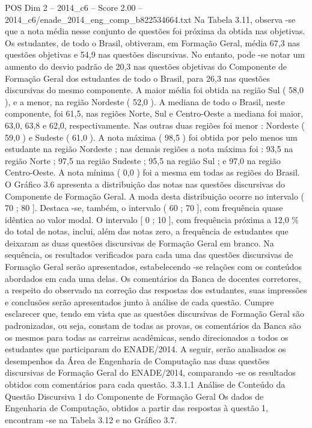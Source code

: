 \begin{textsample}{POS Dim 2 – 2014\_c6 – Score 2.00 – 2014\_c6/enade\_2014\_eng\_comp\_b822534664.txt}
Na Tabela 3.11, observa -se que a nota média nesse conjunto de questões foi próxima da obtida nas objetivas.
Os estudantes, de todo o Brasil, obtiveram, em Formação Geral, média 67,3 nas questões objetivas e 54,9 nas questões discursivas.
No entanto, pode -se notar um aumento do desvio padrão de 20,3 nas questões objetivas do Componente de Formação Geral dos estudantes de todo o Brasil, para 26,3 nas questões discursivas do mesmo componente.
A maior média foi obtida na região Sul ( 58,0 ), e a menor, na região Nordeste ( 52,0 ).
A mediana de todo o Brasil, neste componente, foi 61,5, nas regiões Norte, Sul e Centro-Oeste a mediana foi maior, 63,0, 63,8 e 62,0, respectivamente.
Nas outras duas regiões foi menor : Nordeste ( 59,0 ) e Sudeste ( 61,0 ).
A nota máxima ( 98,5 ) foi obtida por pelo menos um estudante na região Nordeste ; nas demais regiões a nota máxima foi : 93,5 na região Norte ; 97,5 na região Sudeste ; 95,5 na região Sul ; e 97,0 na região Centro-Oeste.
A nota mínima ( 0,0 ) foi a mesma em todas as regiões do Brasil.
O Gráfico 3.6 apresenta a distribuição das notas nas questões discursivas do Componente de Formação Geral.
A moda desta distribuição ocorre no intervalo ( 70 ; 80 ].
Destaca -se, também, o intervalo ( 60 ; 70 ], com frequência quase idêntica ao valor modal.
O intervalo [ 0 ; 10 ], com frequência próxima a 12,0 \% do total de notas, inclui, além das notas zero, a frequência de estudantes que deixaram as duas questões discursivas de Formação Geral em branco.
Na sequência, os resultados verificados para cada uma das questões discursivas de Formação Geral serão apresentados, estabelecendo -se relações com os conteúdos abordados em cada uma delas.
Os comentários da Banca de docentes corretores, a respeito do observado na correção das respostas dos estudantes, suas impressões e conclusões serão apresentados junto à análise de cada questão.
Cumpre esclarecer que, tendo em vista que as questões discursivas de Formação Geral são padronizadas, ou seja, constam de todas as provas, os comentários da Banca são os mesmos para todas as carreiras acadêmicas, sendo direcionados a todos os estudantes que participaram do ENADE/2014.
A seguir, serão analisados os desempenhos da Área de Engenharia de Computação nas duas questões discursivas de Formação Geral do ENADE/2014, comparando -se os resultados obtidos com comentários para cada questão. 3.3.1.1 Análise de Conteúdo da Questão Discursiva 1 do Componente de Formação Geral Os dados de Engenharia de Computação, obtidos a partir das respostas à questão 1, encontram -se na Tabela 3.12 e no Gráfico 3.7.

\end{textsample}
